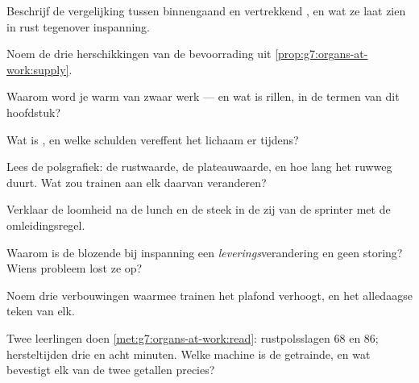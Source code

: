 \begin{exercise}[$\star$]\label{exo:g7:organs-at-work:3}
Beschrijf de vergelijking tussen binnengaand en vertrekkend , en wat
ze laat zien in rust tegenover inspanning.
\end{exercise}

\begin{exercise}[$\star$]\label{exo:g7:organs-at-work:4}
Noem de drie herschikkingen van de bevoorrading uit
\cref{prop:g7:organs-at-work:supply}.
\end{exercise}

\begin{exercise}[$\star$]\label{exo:g7:organs-at-work:5}
Waarom word je warm van zwaar werk --- en wat is rillen, in de termen van
dit hoofdstuk?
\end{exercise}

\begin{exercise}[$\star$]\label{exo:g7:organs-at-work:6}
Wat is , en welke schulden vereffent het lichaam er tijdens?
\end{exercise}

\begin{exercise}[$\star\star$]\label{exo:g7:organs-at-work:7}
Lees de polsgrafiek: de rustwaarde, de plateauwaarde, en hoe lang het
 ruwweg duurt. Wat zou trainen aan elk daarvan veranderen?
\end{exercise}

\begin{exercise}[$\star\star$]\label{exo:g7:organs-at-work:8}
Verklaar de loomheid na de lunch en de steek in de zij van de sprinter met
de omleidingsregel.
\end{exercise}

\begin{exercise}[$\star\star$]\label{exo:g7:organs-at-work:9}
Waarom is de blozende  bij inspanning een \emph{leverings}verandering
en geen storing? Wiens probleem lost ze op?
\end{exercise}

\begin{exercise}[$\star\star$]\label{exo:g7:organs-at-work:10}
Noem drie verbouwingen waarmee trainen het plafond verhoogt, en het
alledaagse teken van elk.
\end{exercise}

\begin{exercise}[$\star\star$]\label{exo:g7:organs-at-work:11}
Twee leerlingen doen \cref{met:g7:organs-at-work:read}: rustpolsslagen
$68$ en $86$; hersteltijden drie en acht minuten. Welke machine is de
getrainde, en wat bevestigt elk van de twee getallen precies?
\end{exercise}

